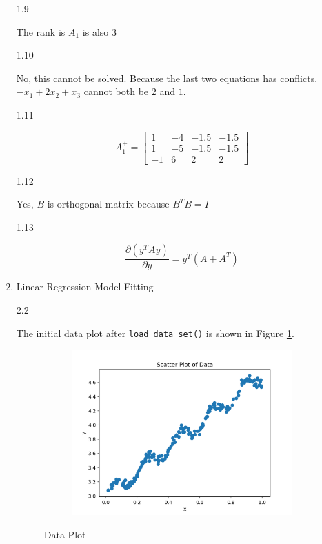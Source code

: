 \documentclass[11pt]{article}
\begin{document}
\begin{enumerate}
1.9

The rank is $A_1$ is also $3$
\medskip

1.10

No, this cannot be solved. Because the last two equations has conflicts. $-x_1+2x_2+x_3$ cannot both be $2$ and $1$.
\medskip

1.11

$$
A_1^+ = \begin{bmatrix}
    1 & -4 & -1.5 & -1.5 \\
    1 & -5 & -1.5 & -1.5 \\
    -1 & 6 & 2 & 2
\end{bmatrix}
$$

1.12

Yes, $B$ is orthogonal matrix because $B^TB=I$
\medskip

1.13

$$ \frac{\partial (y^TAy)}{\partial y} = y^T(A + A^T)$$


\item
Linear Regression Model Fitting

2.2

The initial data plot after \texttt{load\_data\_set()} is shown in Figure \ref{fig:data}.
\medskip

\begin{figure}[!h]
    \centering
    \begin{subfigure}[b]{0.4\linewidth}
      \includegraphics[width=\linewidth]{figures/data.png}
    \end{subfigure}
    \caption{Data Plot}
    \label{fig:data}
\end{figure}


\end{enumerate}
\end{document}

